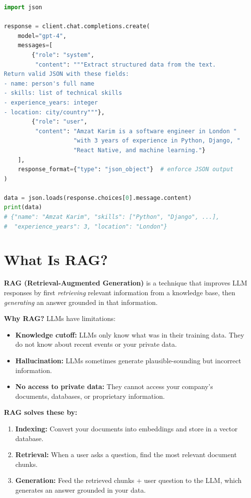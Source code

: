 \documentclass[12pt, a4paper, oneside]{book}
\begin{document}
\begin{lstlisting}[language=Python, caption={Getting structured JSON output from LLMs}]
import json

response = client.chat.completions.create(
    model="gpt-4",
    messages=[
        {"role": "system",
         "content": """Extract structured data from the text.
Return valid JSON with these fields:
- name: person's full name
- skills: list of technical skills
- experience_years: integer
- location: city/country"""},
        {"role": "user",
         "content": "Amzat Karim is a software engineer in London "
                    "with 3 years of experience in Python, Django, "
                    "React Native, and machine learning."}
    ],
    response_format={"type": "json_object"}  # enforce JSON output
)

data = json.loads(response.choices[0].message.content)
print(data)
# {"name": "Amzat Karim", "skills": ["Python", "Django", ...],
#  "experience_years": 3, "location": "London"}
\end{lstlisting}

\section{What Is RAG?}

\textbf{RAG (Retrieval-Augmented Generation)} is a technique that improves LLM responses by first \emph{retrieving} relevant information from a knowledge base, then \emph{generating} an answer grounded in that information.

\textbf{Why RAG?} LLMs have limitations:
\begin{itemize}[leftmargin=2em]
    \item \textbf{Knowledge cutoff:} LLMs only know what was in their training data. They do not know about recent events or your private data.
    \item \textbf{Hallucination:} LLMs sometimes generate plausible-sounding but incorrect information.
    \item \textbf{No access to private data:} They cannot access your company's documents, databases, or proprietary information.
\end{itemize}

\textbf{RAG solves these by:}
\begin{enumerate}[leftmargin=2em]
    \item \textbf{Indexing:} Convert your documents into embeddings and store in a vector database.
    \item \textbf{Retrieval:} When a user asks a question, find the most relevant document chunks.
    \item \textbf{Generation:} Feed the retrieved chunks + user question to the LLM, which generates an answer grounded in your data.
\end{enumerate}
\end{document}
